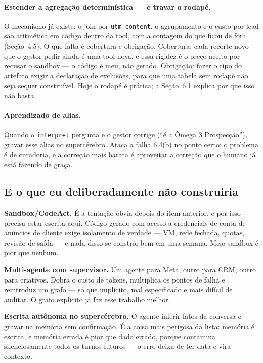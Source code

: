 \documentclass[10pt,twocolumn]{article}
\newcommand{\code}[1]{\texttt{\footnotesize #1}}
\begin{document}
\paragraph{Estender a agregação determinística --- e travar o rodapé.} O mecanismo já
existe: o join por \code{utm\_content}, o agrupamento e o custo por lead são aritmética em
código dentro da tool, com a contagem do que ficou de fora (Seção~4.5). O que falta é
cobertura e obrigação. Cobertura: cada recorte novo que o gestor pedir ainda é uma tool
nova, e essa rigidez é o preço aceito por recusar o sandbox --- o código é meu, não gerado.
Obrigação: fazer o tipo do artefato exigir a declaração de exclusões, para que uma tabela
sem rodapé não seja sequer construível. Hoje o rodapé é prática; a Seção~6.1 explica por que
isso não basta.

\paragraph{Aprendizado de alias.} Quando o \code{interpret} pergunta e o gestor corrige
(``é a Ômega 3 Prospecção''), gravar esse alias no supercérebro. Ataca a falha 6.4(b) no
ponto certo: o problema é de curadoria, e a correção mais barata é aproveitar a correção que
o humano já está fazendo de graça.

\subsection{E o que eu deliberadamente não construiria}

\textbf{Sandbox/CodeAct.} É a tentação óbvia depois do item anterior, e por isso precisa
estar escrita aqui. Código gerado com acesso a credenciais de conta de anúncios de cliente
exige isolamento de verdade --- VM, rede fechada, quotas, revisão de saída --- e nada disso
se constrói bem em uma semana. Meio sandbox é pior que nenhum.

\textbf{Multi-agente com supervisor.} Um agente para Meta, outro para CRM, outro para
criativos. Dobra o custo de tokens, multiplica os pontos de falha e reintroduz um grafo ---
só que implícito, mal especificado e mais difícil de auditar. O grafo explícito já faz esse
trabalho melhor.

\textbf{Escrita autônoma no supercérebro.} O agente inferir fatos da conversa e gravar na
memória sem confirmação. É a coisa mais perigosa da lista: memória é escrita, e memória
errada é pior que dado errado, porque contamina silenciosamente todos os turnos futuros ---
o erro deixa de ter data e vira contexto.
\end{document}
